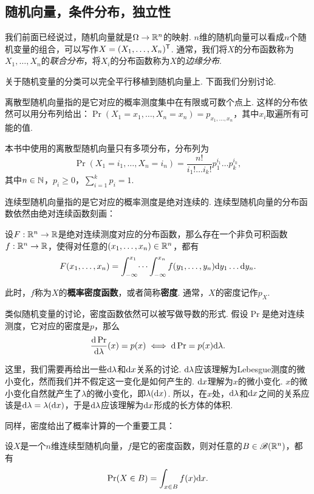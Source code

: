 \subsection{随机向量，条件分布，独立性}\label{subsec:random-vector}

我们前面已经说过，随机向量就是$\Omega\to\mathbb{R}^n$的映射. $n$维的随机向量可以看成$n$个随机变量的组合，可以写作$X=(X_1,\dots,X_n)^{\mathsf{T}}$. 通常，我们将$X$的分布函数称为$X_1,\dots,X_n$的\textit{联合分布}，将$X_i$的分布函数称为$X$的\textit{边缘分布}.

关于随机变量的分类可以完全平行移植到随机向量上. 下面我们分别讨论. 

离散型随机向量指的是它对应的概率测度集中在有限或可数个点上. 这样的分布依然可以用分布列给出：$\Pr(X_1=x_1,\dots,X_n=x_n)=p_{x_1,\dots,x_n}$，其中$x_i$取遍所有可能的值. 

本书中使用的离散型随机向量只有多项分布，分布列为
\[\Pr(X_1=i_1,\dots,X_n=i_n)=\frac{n!}{i_1!\dots i_k!}p_1^{i_1}\dots p_k^{i_k},\]
其中$n\in\mathbb{N}$，$p_i\geq 0$，$\sum_{i=1}^k p_i=1$. 

连续型随机向量指的是它对应的概率测度是绝对连续的. 连续型随机向量的分布函数依然由绝对连续函数刻画：

\begin{theorem}\label{theorem:continuous-vector}
设$F:\mathbb{R}^n\to\mathbb{R}$是绝对连续测度对应的分布函数，那么存在一个非负可积函数$f:\mathbb{R}^n\to\mathbb{R}$，使得对任意的$(x_1,\dots,x_n)\in\mathbb{R}^n$，都有
\[F(x_1,\dots,x_n)=\int_{-\infty}^{x_1}\dots\int_{-\infty}^{x_n}f(y_1,\dots,y_n)\mathrm{d} y_1\dots\mathrm{d} y_n.\]
\end{theorem}

此时，$f$称为$X$的\textbf{概率密度函数}，或者简称\textbf{密度}. 通常，$X$的密度记作$p_X$.

类似随机变量的讨论，密度函数依然可以被写做导数的形式. 假设$\Pr$是绝对连续测度，它对应的密度是$p$，那么
\[\frac{\mathrm{d}\Pr}{\mathrm{d}\lambda}(x)=p(x)\iff \mathrm{d}\Pr=p(x)\mathrm{d}\lambda.\]

这里，我们需要再给出一些$\mathrm{d}\lambda$和$\mathrm{d} x$关系的讨论. $\mathrm{d}\lambda$应该理解为Lebesgue测度的微小变化，然而我们并不假定这一变化是如何产生的. $\mathrm{d} x$理解为$x$的微小变化. $x$的微小变化自然就产生了$\lambda$的微小变化，即$\lambda(\mathrm{d} x)$. 所以，在$x$处，$\mathrm{d}\lambda$和$\mathrm{d} x$之间的关系应该是$\mathrm{d}\lambda=\lambda(\mathrm{d} x)$，于是$\mathrm{d}\lambda$应该理解为$\mathrm{d} x$形成的长方体的体积. 

同样，密度给出了概率计算的一个重要工具：
\begin{theorem}\label{theorem:continuous-prob-vec}
    设$X$是一个$n$维连续型随机向量，$f$是它的密度函数，则对任意的$B\in\mathscr{B}(\mathbb{R}^n)$，都有
    \[\Pr(X\in B)=\int_{x\in B}f(x)\mathrm{d} x.\]
\end{theorem}

